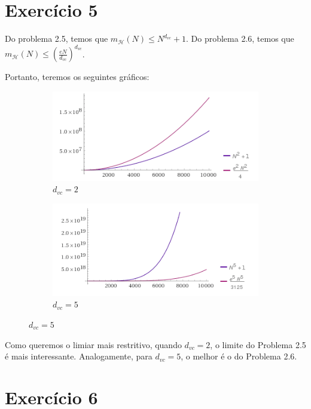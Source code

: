 \documentclass[12pt,letterpaper]{article}
\begin{document}
	
	\section*{Exercício 5}
	
	Do problema 2.5, temos que $ m_{\mathcal{H}}(N) \leq N^{d_{vc}} +1 $. Do problema 2.6, temos que $ m_{\mathcal{H}}(N) \leq \left(\frac{eN}{d_{vc}}\right)^{d_{vc}}$. 
	
	Portanto, teremos os seguintes gráficos:
	
	\begin{figure}[h]
		\centering
		\begin{subfigure}{.5\linewidth}
			\centering
			\includegraphics[width=\linewidth]{exercicio5a}
			\caption{$ d_{vc} = 2 $}
		\end{subfigure}%
		\begin{subfigure}{.5\linewidth}
			\centering
			\includegraphics[width=\linewidth]{exercicio5b}
			\caption{$ d_{vc} = 5 $}
		\end{subfigure}
	\end{figure}
	
	Como queremos o limiar mais restritivo, quando $d_{vc} = 2$, o limite do Problema 2.5 é mais interessante. Analogamente, para $d_{vc} = 5$, o melhor é o do Problema 2.6.
	
	\section*{Exercício 6}
	
\end{document}
